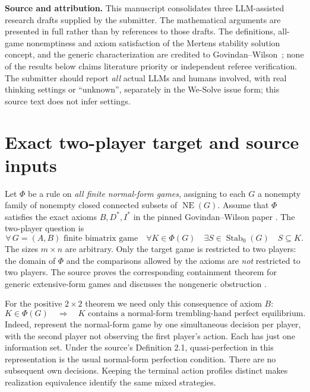 \documentclass[11pt]{article}
\newcommand{\NE}{\operatorname{NE}}
\newcommand{\Stab}{\operatorname{Stab}_0}
\theoremstyle{definition}
\theoremstyle{remark}
\begin{document}
\medskip
\noindent\textbf{Source and attribution.} This manuscript consolidates
three LLM-assisted research drafts supplied by the submitter. The
mathematical arguments are presented in full rather than by references
to those drafts. The definitions, all-game nonemptiness and axiom
satisfaction of the Mertens stability solution concept, and the generic
characterization are credited to Govindan--Wilson~\cite{gw}; none of
the results below claims literature priority or independent referee
verification. The submitter should report \emph{all} actual LLMs and
humans involved, with real thinking settings or ``unknown'', separately
in the We-Solve issue form; this source text does not infer settings.

\section{Exact two-player target and source inputs}\label{sec:scope}
Let $\Phi$ be a rule on \emph{all finite normal-form games}, assigning to each
$G$ a nonempty family of nonempty closed connected subsets of $\NE(G)$.
Assume that $\Phi$ satisfies the exact axioms $B,D^*,I^*$ in the pinned
Govindan--Wilson paper \cite[Sections 3--5]{gw}. The two-player question is
\begin{equation}\label{eq:target}
 \forall\,G=(A,B)\text{ finite bimatrix game}\quad
 \forall K\in\Phi(G)\quad
 \exists S\in\Stab(G)\quad S\subseteq K.
\end{equation}
The sizes $m\times n$ are arbitrary. Only the target game is restricted to two
players: the domain of $\Phi$ and the comparisons allowed by the axioms are
\emph{not} restricted to two players. The source proves the corresponding
containment theorem for generic extensive-form games and discusses the
nongeneric obstruction \cite[Theorem 6.1 and Section 10]{gw}.

For the positive $2\times2$ theorem we need only this consequence of axiom $B$:
\begin{equation}\label{eq:Bsim}
 K\in\Phi(G)\quad\Longrightarrow\quad
 K\text{ contains a normal-form trembling-hand perfect equilibrium.}
\end{equation}
Indeed, represent the normal-form game by one simultaneous decision per player,
with the second player not observing the first player's action. Each has just
one information set. Under the source's Definition 2.1, quasi-perfection in
this representation is the usual normal-form perfection condition. There are
no subsequent own decisions. Keeping the terminal action profiles distinct
makes realization equivalence identify the same mixed strategies.
\end{document}
